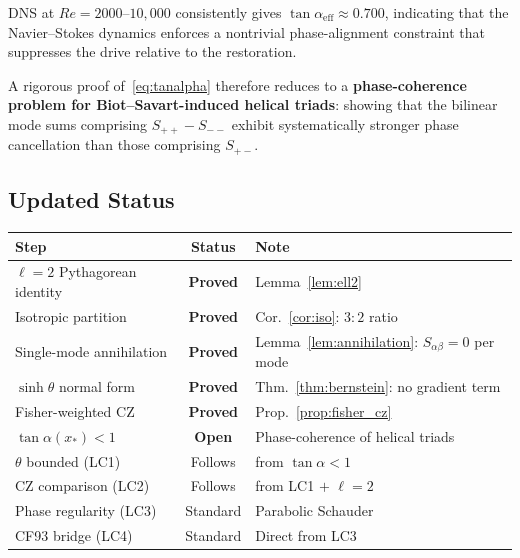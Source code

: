 \documentclass[12pt,a4paper]{article}
\theoremstyle{definition}
\begin{document}
DNS at $Re=2000$--$10{,}000$ consistently gives
$\tan\alpha_{\mathrm{eff}}\approx 0.700$, indicating that
the Navier--Stokes dynamics enforces a nontrivial phase-alignment
constraint that suppresses the drive relative to the restoration.

A rigorous proof of~\eqref{eq:tanalpha} therefore reduces to a
\textbf{phase-coherence problem for Biot--Savart-induced helical triads}:
showing that the bilinear mode sums comprising $S_{++}-S_{--}$
exhibit systematically stronger phase cancellation than those
comprising $S_{+-}$.

\subsection{Updated Status}

\begin{center}
\begin{tabular}{lcp{6cm}}
\toprule
\textbf{Step} & \textbf{Status} & \textbf{Note} \\
\midrule
$\ell=2$ Pythagorean identity & \textbf{Proved} & Lemma~\ref{lem:ell2} \\
Isotropic partition & \textbf{Proved} & Cor.~\ref{cor:iso}: $3:2$ ratio \\
Single-mode annihilation & \textbf{Proved} &
  Lemma~\ref{lem:annihilation}: $S_{\alpha\beta}=0$ per mode \\
$\sinh\theta$ normal form & \textbf{Proved} &
  Thm.~\ref{thm:bernstein}: no gradient term \\
Fisher-weighted CZ & \textbf{Proved} &
  Prop.~\ref{prop:fisher_cz} \\
\midrule
$\tan\alpha(x_*)<1$ & \textbf{Open} &
  Phase-coherence of helical triads \\
\midrule
$\theta$ bounded (LC1) & Follows & from $\tan\alpha<1$ \\
CZ comparison (LC2) & Follows & from LC1 $+$ $\ell=2$ \\
Phase regularity (LC3) & Standard & Parabolic Schauder \\
CF93 bridge (LC4) & Standard & Direct from LC3 \\
\bottomrule
\end{tabular}
\end{center}
\end{document}
